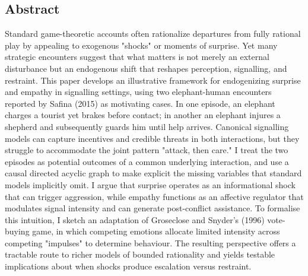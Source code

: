 
\begin{center}
    \subsection*{Abstract}
\end{center}

Standard game-theoretic accounts often rationalize departures from fully rational play by appealing to exogenous "shocks" or moments of surprise. Yet many strategic encounters suggest that what matters is not merely an external disturbance but an endogenous shift that reshapes perception, signalling, and restraint. This paper develops an illustrative framework for endogenizing surprise and empathy in signalling settings, using two elephant-human encounters reported by Safina (2015) as motivating cases. In one episode, an elephant charges a tourist yet brakes before contact; in another an elephant injures a shepherd and subsequently guards him until help arrives. Canonical signalling models can capture incentives and credible threats in both interactions, but they struggle to accommodate the joint pattern "attack, then care." I treat the two episodes as potential outcomes of a common underlying interaction, and use a causal directed acyclic graph to make explicit the missing variables that standard models implicitly omit. I argue that surprise operates as an informational shock that can trigger aggression, while empathy functions as an affective regulator that modulates signal intensity and can generate post-conflict assistance. To formalise this intuition, I sketch an adaptation of Groseclose and Snyder's (1996) vote-buying game, in which competing emotions allocate limited intensity across competing "impulses" to determine behaviour. The resulting perspective offers a tractable route to richer models of bounded rationality and yields testable implications about when shocks produce escalation versus restraint.

